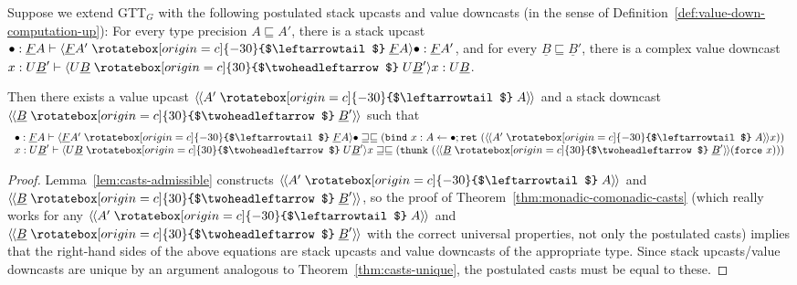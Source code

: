 \documentclass[acmsmall,nonacm]{acmart}
\renewcommand{\u}{\underline}
\newcommand{\ltdyn}{\sqsubseteq}
\newcommand{\gtdyn}{\sqsupseteq}
\newcommand{\equidyn}{\mathrel{\gtdyn\ltdyn}}
\newcommand{\uarrow}{\mathrel{\rotatebox[origin=c]{-30}{$\leftarrowtail$}}}
\newcommand{\darrow}{\mathrel{\rotatebox[origin=c]{30}{$\twoheadleftarrow$}}}
\newcommand{\upcast}[2]{\langle{#2}\uarrow{#1}\rangle}
\newcommand{\dncast}[2]{\langle{#1}\darrow{#2}\rangle}
\newcommand{\defupcast}[2]{\langle\kern-1ex~\langle{#2}\uarrow{#1}\rangle\kern-1ex~\rangle}
\newcommand{\defdncast}[2]{\langle\kern-1ex~\langle{#1}\darrow{#2}\rangle\kern-1ex~\rangle}
\newcommand{\bindXtoYinZ}[2]{\kw{bind}#2 \leftarrow #1;}
\newcommand{\kw}[1]{\texttt{#1}\,\,}
\newcommand{\ret}{\kw{ret}}
\newcommand{\thunk}{\kw{thunk}}
\newcommand{\force}{\kw{force}}
\begin{document}
\begin{theorem}
  \label{thm:upcasts-values-downcasts-stacks}
  Suppose we extend GTT$_G$ with the following postulated stack upcasts
  and value downcasts (in the sense of
  Definition~\ref{def:value-down-computation-up}): For every type
  precision $A \ltdyn A'$, there is a stack upcast $\bullet : \u F A
  \vdash \upcast{\u F A}{\u F A'}{\bullet} : \u F A'$, and for every $\u
  B \ltdyn \u B'$, there is a complex value downcast $x : U \u B' \vdash
  \dncast{U \u B}{U \u B'}{x} : U \u B$.

  Then there exists a value upcast $\defupcast{A}{A'}$ and a stack
  downcast $\defdncast{\u B}{\u B'}$ such that
  \[
  \begin{array}{c}
  \bullet : \u F A \vdash \upcast{\u F A}{\u F A'}{\bullet} \equidyn { (\bindXtoYinZ{{\bullet}}{x:A}{\ret{(\defupcast{A}{A'}{x})}})}\\
  x : U \u B' \vdash \dncast{U \u B}{U \u B'}{x} \equidyn {(\thunk{(\defdncast{\u B}{\u B'}{(\force x)})})}
  \end{array}
  \]
\end{theorem}

\begin{proof}
Lemma~\ref{lem:casts-admissible} constructs $\defupcast{A}{A'}$ and
$\defdncast{\u B}{\u B'}$, so the proof of
Theorem~\ref{thm:monadic-comonadic-casts} (which really works for any
$\defupcast{A}{A'}$ and $\defdncast{\u B}{\u B'}$ with the correct
universal properties, not only the postulated casts) implies that the
right-hand sides of the above equations are stack upcasts and value
downcasts of the appropriate type.  Since stack upcasts/value downcasts
are unique by an argument analogous to Theorem~\ref{thm:casts-unique},
the postulated casts must be equal to these.
\end{proof}
\end{document}
